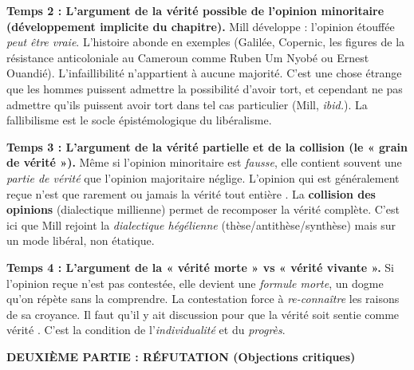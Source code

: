 \documentclass[11pt]{article}
\newcommand{\cle}[1]{{\popxbold\color{popdark}#1}}
\begin{document}
\begin{exoresolu}
\textbf{Temps 2 : L'argument de la vérité possible de l'opinion minoritaire (développement implicite du chapitre).}
Mill développe : l'opinion étouffée \emph{peut être vraie}. L'histoire abonde en exemples (Galilée, Copernic, les figures de la résistance anticoloniale au Cameroun comme Ruben Um Nyobé ou Ernest Ouandié). L'infaillibilité n'appartient à aucune majorité. \guillemotleft C'est une chose étrange que les hommes puissent admettre la possibilité d'avoir tort, et cependant ne pas admettre qu'ils puissent avoir tort dans tel cas particulier \guillemotright (Mill, \emph{ibid.}). La \cle{fallibilisme} est le socle épistémologique du libéralisme.

\textbf{Temps 3 : L'argument de la vérité partielle et de la collision (le « grain de vérité »).}
Même si l'opinion minoritaire est \emph{fausse}, elle contient souvent une \emph{partie de vérité} que l'opinion majoritaire néglige. \guillemotleft L'opinion qui est généralement reçue n'est que rarement ou jamais la vérité tout entière \guillemotright. La \textbf{collision des opinions} (dialectique millienne) permet de recomposer la vérité complète. C'est ici que Mill rejoint la \emph{dialectique hégélienne} (thèse/antithèse/synthèse) mais sur un mode libéral, non étatique.

\textbf{Temps 4 : L'argument de la « vérité morte » vs « vérité vivante ».}
Si l'opinion reçue n'est pas contestée, elle devient une \emph{formule morte}, un dogme qu'on répète sans la comprendre. La contestation force à \emph{re-connaître} les raisons de sa croyance. \guillemotleft Il faut qu'il y ait discussion pour que la vérité soit sentie comme vérité \guillemotright. C'est la condition de l'\emph{individualité} et du \emph{progrès}.

\textbf{DEUXIÈME PARTIE : RÉFUTATION (Objections critiques)}


\end{exoresolu}
\end{document}
